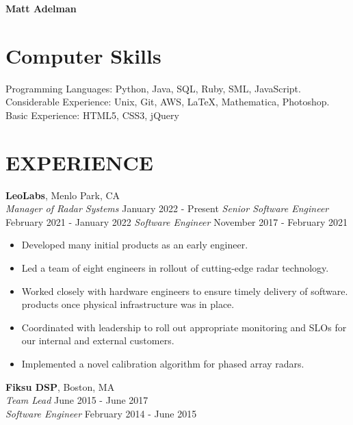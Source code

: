 \documentclass[11pt]{res} %
\begin{document}
{\bf\Large Matt Adelman}

\address{2394 Williams Street $\bullet$ Palo Alto, CA 94306 \\
        (201) 323-2719 $\bullet$ mxadelman@gmail.com}

\address{}

\begin{resume}

\section{Computer Skills}
Programming Languages: Python, Java, SQL, Ruby, SML, JavaScript.\\
Considerable Experience: Unix, Git, AWS, \LaTeX,
Mathematica, Photoshop.\\
Basic Experience: HTML5, CSS3, jQuery

\section{EXPERIENCE}
{\bf LeoLabs}, Menlo Park, CA\\
{\it Manager of Radar Systems} \hfill January 2022 - Present\!
{\it Senior Software Engineer} \hfill February 2021 - January 2022\!
{\it Software Engineer} \hfill November 2017 - February 2021\!

\vspace{0.01in} %
   \begin{itemize} \itemsep -2pt  %
   \item Developed many initial products as an early engineer.
   \item Led a team of eight engineers in rollout of cutting-edge radar technology.
   \item Worked closely with hardware engineers to ensure timely delivery of software.
     products once physical infrastructure was in place.
   \item Coordinated with leadership to roll out appropriate monitoring and SLOs for our
     internal and external customers.
   \item Implemented a novel calibration algorithm for phased array radars.
   \end{itemize}

{\bf Fiksu DSP}, Boston, MA\\
{\it Team Lead} \hfill June 2015 - June 2017 \\
{\it Software Engineer} \hfill February 2014 - June 2015\!


\end{resume}
\end{document}
